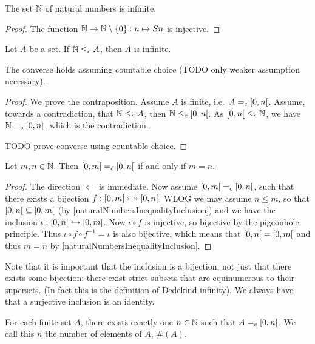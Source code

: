 \begin{corollary}
The set $\mathbb{N}$ of natural numbers is infinite.
\end{corollary}
\begin{proof}
The function $\mathbb{N}\to \mathbb{N}\setminus\{0\}: n\mapsto Sn$ is injective.
\end{proof}
\begin{corollary} \label{infiniteComparisonWithN}
Let $A$ be a set. If $\mathbb{N}\leq_c A$, then $A$ is infinite.

The converse holds assuming countable choice (TODO only weaker assumption necessary).
\end{corollary}
\begin{proof}
We prove the contraposition. Assume $A$ is finite, i.e.\ $A =_c\interval[co]{0,n}$. Assume, towards a contradiction, that $\mathbb{N}\leq_c A$, then $\N \leq_c \interval[co]{0,n}$. As $\interval[co]{0,n} \leq_c \N$, we have $\N =_c \interval[co]{0,n}$, which is the contradiction.

TODO prove converse using countable choice.
\end{proof}
\begin{corollary}
Let $m,n\in \mathbb{N}$. Then $\interval[co]{0,m} =_c \interval[co]{0,n}$ \textup{if and only if} $m=n$.
\end{corollary}
\begin{proof}
The direction $\Leftarrow$ is immediate. Now assume $\interval[co]{0,m} =_c \interval[co]{0,n}$, such that there exists a bijection $f: \interval[co]{0,m} \bij \interval[co]{0,n}$. WLOG we may assume $n \leq m$, so that $\interval[co]{0,n} \subseteq \interval[co]{0,m}$ (by \ref{naturalNumbersInequalityInclusion}) and we have the inclusion $\iota: \interval[co]{0,n} \hookrightarrow \interval[co]{0,m}$. Now $\iota \circ f$ is injective, so bijective by the pigeonhole principle. Thus $\iota \circ f\circ f^{-1} = \iota$ is also bijective, which means that $\interval[co]{0,n} = \interval[co]{0,m}$ and thus $m=n$ by \ref{naturalNumbersInequalityInclusion}.
\end{proof}
Note that it is important that the inclusion is a bijection, not just that there exists some bijection: there exist strict subsets that are equinumerous to their supersets. (In fact this is the definition of Dedekind infinity). We always have that a surjective inclusion is an identity.
\begin{corollary} \label{finiteSetNumberOfElements}
For each finite set $A$, there exists exactly one $n\in\mathbb{N}$ such that $A =_c \interval[co]{0,n}$. We call this $n$ the number of elements of $A$, $\#(A)$.
\end{corollary}
